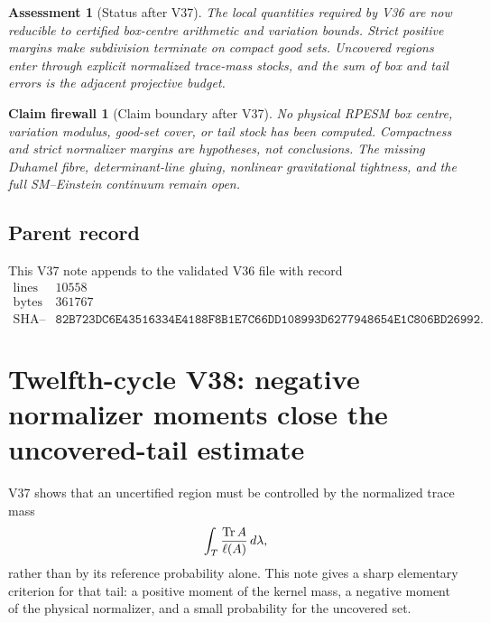 \documentclass[11pt]{article}
\newtheorem{firewall}[theorem]{Claim firewall}
\newtheorem{assessment}[theorem]{Assessment}
\theoremstyle{remark}
\begin{document}
\begin{assessment}[Status after V37]
\label{ass:v12v37-status}
The local quantities required by V36 are now reducible to certified
box-centre arithmetic and variation bounds.  Strict positive margins
make subdivision terminate on compact good sets.  Uncovered regions
enter through explicit normalized trace-mass stocks, and the sum of
box and tail errors is the adjacent projective budget.
\end{assessment}

\begin{firewall}[Claim boundary after V37]
\label{fire:v12v37-claim}
No physical RPESM box centre, variation modulus, good-set cover, or
tail stock has been computed.  Compactness and strict normalizer
margins are hypotheses, not conclusions.  The missing Duhamel fibre,
determinant-line gluing, nonlinear gravitational tightness, and the
full SM--Einstein continuum remain open.
\end{firewall}

\subsection{Parent record}

This V37 note appends to the validated V36 file with record
\[
\begin{array}{c|c}
\text{lines}&10558\\
\text{bytes}&361767\\
\text{SHA--256}&
\texttt{82B723DC6E43516334E4188F8B1E7C66DD108993D6277948654E1C806BD26992}.
\end{array}
\]


\section{Twelfth-cycle V38: negative normalizer moments close the
uncovered-tail estimate}
\label{sec:v12v38}

V37 shows that an uncertified region must be controlled by the
normalized trace mass
\[
 \int_T{\operatorname{Tr}A\over\ell(A)}\,d\lambda,
\]
rather than by its reference probability alone.  This note gives a
sharp elementary criterion for that tail: a positive moment of the
kernel mass, a negative moment of the physical normalizer, and a
small probability for the uncovered set.
\end{document}
